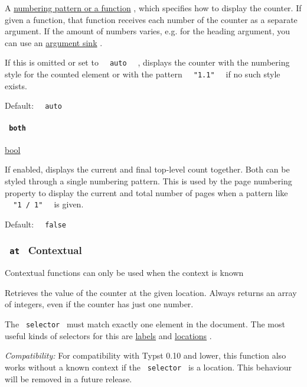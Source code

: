 A \href{/docs/reference/model/numbering/}{numbering pattern or a
function} , which specifies how to display the counter. If given a
function, that function receives each number of the counter as a
separate argument. If the amount of numbers varies, e.g. for the heading
argument, you can use an
\href{/docs/reference/foundations/arguments/}{argument sink} .

If this is omitted or set to \texttt{\ }{\texttt{\ auto\ }}\texttt{\ } ,
displays the counter with the numbering style for the counted element or
with the pattern \texttt{\ }{\texttt{\ "1.1"\ }}\texttt{\ } if no such
style exists.

Default: \texttt{\ }{\texttt{\ auto\ }}\texttt{\ }

\paragraph{\texorpdfstring{\texttt{\ both\ }}{ both }}\label{definitions-display-both}

\href{/docs/reference/foundations/bool/}{bool}

If enabled, displays the current and final top-level count together.
Both can be styled through a single numbering pattern. This is used by
the page numbering property to display the current and total number of
pages when a pattern like \texttt{\ }{\texttt{\ "1\ /\ 1"\ }}\texttt{\ }
is given.

Default: \texttt{\ }{\texttt{\ false\ }}\texttt{\ }

\subsubsection{\texorpdfstring{\texttt{\ at\ } {{ Contextual
}}}{ at   Contextual }}\label{definitions-at}

\label{definitions-at-contextual-tooltip}
Contextual functions can only be used when the context is known

Retrieves the value of the counter at the given location. Always returns
an array of integers, even if the counter has just one number.

The \texttt{\ selector\ } must match exactly one element in the
document. The most useful kinds of selectors for this are
\href{/docs/reference/foundations/label/}{labels} and
\href{/docs/reference/introspection/location/}{locations} .

\emph{Compatibility:} For compatibility with Typst 0.10 and lower, this
function also works without a known context if the \texttt{\ selector\ }
is a location. This behaviour will be removed in a future release.


